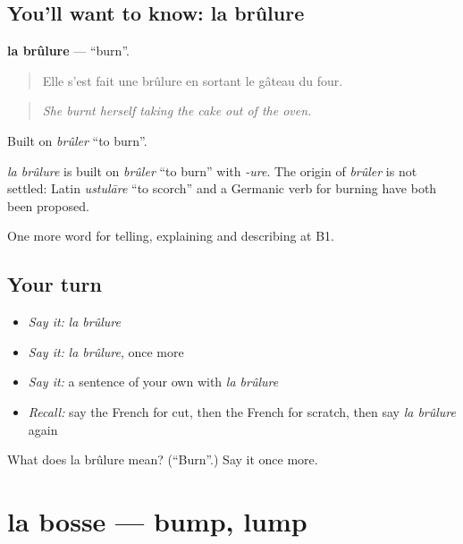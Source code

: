 \subsection*{You'll want to know: la brûlure}
\textbf{la brûlure} — \textquotedblleft{}burn\textquotedblright{}.

\begin{quote}
Elle s'est fait une brûlure en sortant le gâteau du four.
\end{quote}

\begin{quote}
\emph{She burnt herself taking the cake out of the oven.}
\end{quote}

Built on \emph{brûler} \textquotedblleft{}to burn\textquotedblright{}.

\begin{cousinweb}
\emph{la brûlure} is built on \emph{brûler} \textquotedblleft{}to burn\textquotedblright{} with \emph{-ure}. The origin of \emph{brûler} is not settled: Latin \emph{ustulāre} \textquotedblleft{}to scorch\textquotedblright{} and a Germanic verb for burning have both been proposed.
\end{cousinweb}

\begin{grammarlens}[title={What you've built}]
One more word for telling, explaining and describing at B1.
\end{grammarlens}

\subsection*{Your turn}
\begin{itemize}
\raggedright
  \item \emph{Say it:} \emph{la brûlure}
  \item \emph{Say it:} \emph{la brûlure}, once more
  \item \emph{Say it:} a sentence of your own with \emph{la brûlure}
  \item \emph{Recall:} say the French for cut, then the French for scratch, then say \emph{la brûlure} again
\end{itemize}

\begin{tcolorbox}[breakable,colback=teal!4,colframe=teal!35!black,title={Before you move on}]
What does la brûlure mean? (\textquotedblleft{}Burn\textquotedblright{}.) Say it once more.
\end{tcolorbox}
\section[la bosse]{la bosse — bump, lump}


